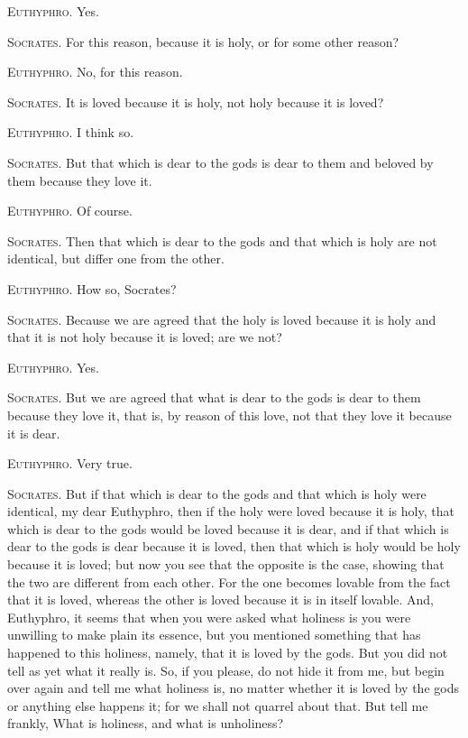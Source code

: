 \textsc{Euthyphro}. Yes.

\textsc{Socrates}. For this reason, because it is holy, or for some
other reason?

\textsc{Euthyphro}. No, for this reason.

\textsc{Socrates}. It is loved because it is holy, not holy because it
is loved?

\textsc{Euthyphro}. I think so.

\textsc{Socrates}. But that which is dear to the gods is dear to them
and beloved by them because they love it.

\textsc{Euthyphro}. Of course.

\textsc{Socrates}. Then that which is dear to the gods and that which
is holy are not identical, but differ one from the other.

\textsc{Euthyphro}. How so, Socrates?

\textsc{Socrates}. Because we are agreed that the holy is loved
because it is holy and that it is not holy because it is loved; are we
not?

\textsc{Euthyphro}. Yes.

\textsc{Socrates}. But we are agreed that what is dear to the gods is
dear to them because they love it, that is, by reason of this love,
not that they love it because it is dear.

\textsc{Euthyphro}. Very true.

\textsc{Socrates}. But if that which is dear to the gods and that
which is holy were identical, my dear Euthyphro, then if the holy were
loved because it is holy, that which is dear to the gods would be
loved because it is dear, and if that which is dear to the gods is
dear because it is loved, then that which is holy would be holy
because  it is loved; but now you see that the opposite is
the case, showing that the two are different from each other. For the
one becomes lovable from the fact that it is loved, whereas the other
is loved because it is in itself lovable. And, Euthyphro, it seems
that when you were asked what holiness is you were unwilling to make
plain its essence, but you mentioned something that has happened to
this holiness, namely, that it is loved by the gods. But you did not
tell as yet what it really is. So, if you please, do not hide it from
me, but begin over again and tell me what holiness is, no matter
whether it is loved by the gods or anything else happens it; for we
shall not quarrel about that. But tell me frankly, What is holiness,
and what is unholiness?

